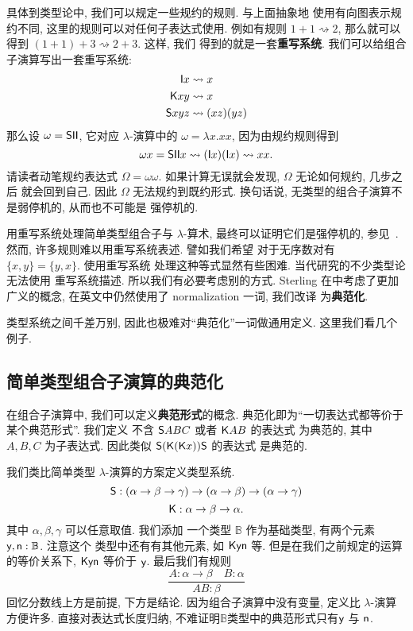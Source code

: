 具体到类型论中, 我们可以规定一些规约的规则. 与上面抽象地
使用有向图表示规约不同, 这里的规则可以对任何子表达式使用.
例如有规则 \(1 + 1 \rightsquigarrow 2\), 那么就可以
得到 \((1+1)+3 \rightsquigarrow 2 + 3\). 这样, 我们
得到的就是一套\textbf{重写系统}. 我们可以给组合子演算写出一套重写系统:
\[\begin{aligned}
\textsf{I}x & \rightsquigarrow x\\
\textsf{K}xy &\rightsquigarrow x\\
\textsf{S}xyz &\rightsquigarrow (xz)(yz)
\end{aligned}\]
那么设 \(\omega = \textsf{S}\textsf{I}\textsf{I}\),
它对应 \(\lambda\)-演算中的 \(\omega = \lambda x. xx\),
因为由规约规则得到
\[\omega x = \textsf{S}\textsf{I}\textsf{I}x \rightsquigarrow (\textsf{I}x)(\textsf{I}x) \rightsquigarrow xx.\]
请读者动笔规约表达式 \(\Omega = \omega\omega\).
如果计算无误就会发现, \(\Omega\) 无论如何规约, 几步之后
就会回到自己. 因此 \(\Omega\) 无法规约到既约形式.
换句话说, 无类型的组合子演算不是弱停机的, 从而也不可能是
强停机的.

用重写系统处理简单类型组合子与 \(\lambda\)-算术,
最终可以证明它们是强停机的, 参见~\cite{loader:1998:stlc}.
然而, 许多规则难以用重写系统表述. 譬如我们希望
对于无序数对有 \(\{x,y\} = \{y,x\}\). 使用重写系统
处理这种等式显然有些困难. 当代研究的不少类型论无法使用
重写系统描述. 所以我们有必要考虑别的方式. Sterling
在\cite{sterling:2021:thesis}中考虑了更加广义的概念,
在英文中仍然使用了 normalization 一词, 我们改译
为\textbf{典范化}.

类型系统之间千差万别, 因此也极难对“典范化”一词做通用定义.
这里我们看几个例子.

\subsection{简单类型组合子演算的典范化}
在组合子演算中, 我们可以定义\textbf{典范形式}的概念.
典范化即为“一切表达式都等价于某个典范形式”. 我们定义
不含 \(\textsf{S}ABC\) 或者 \(\textsf{K}AB\) 的表达式
为典范的, 其中 \(A,B,C\) 为子表达式. 因此类似
\(\textsf{S}(\textsf{K}(\textsf{K}x))\textsf{S}\) 的表达式
是典范的.

我们类比简单类型 \(\lambda\)-演算的方案定义类型系统.
\[\textsf{S} : (\alpha \to \beta \to \gamma)
\to (\alpha \to \beta) \to (\alpha \to \gamma)\]
\[\textsf{K} : \alpha \to \beta \to \alpha.\]
其中 \(\alpha,\beta,\gamma\) 可以任意取值. 我们添加
一个类型 \(\mathbb B\) 作为基础类型, 有两个元素
\(\textsf{y}, \textsf{n} : \mathbb B\). 注意这个
类型中还有有其他元素, 如 \(\textsf{K}\textsf{y}\textsf{n}\) 等.
但是在我们之前规定的运算的等价关系下, \(\textsf{K}\textsf{y}\textsf{n}\) 等价于 \(\textsf{y}\).
最后我们有规则
\[\frac{A : \alpha \to \beta \quad B : \alpha}{AB : \beta}\]
回忆分数线上方是前提, 下方是结论. 因为组合子演算中没有变量,
定义比 \(\lambda\)-演算方便许多. 直接对表达式长度归纳,
不难证明\(\mathbb B\)类型中的典范形式只有\(\textsf{y}\)
与 \(\textsf{n}\).

